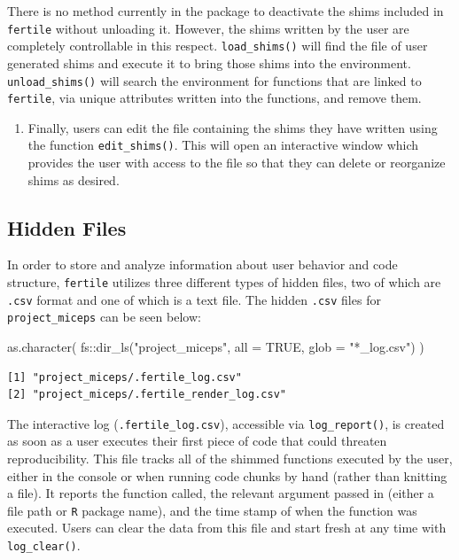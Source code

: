 \documentclass[12pt,twoside]{reedthesis}
\newenvironment{Shaded}{\begin{snugshade}}{\end{snugshade}}
\newcommand{\AttributeTok}[1]{\textcolor[rgb]{0.77,0.63,0.00}{#1}}
\newcommand{\ConstantTok}[1]{\textcolor[rgb]{0.00,0.00,0.00}{#1}}
\newcommand{\FunctionTok}[1]{\textcolor[rgb]{0.00,0.00,0.00}{#1}}
\newcommand{\NormalTok}[1]{#1}
\newcommand{\SpecialCharTok}[1]{\textcolor[rgb]{0.00,0.00,0.00}{#1}}
\newcommand{\StringTok}[1]{\textcolor[rgb]{0.31,0.60,0.02}{#1}}
\providecommand{\tightlist}{%
  \setlength{\itemsep}{0pt}\setlength{\parskip}{0pt}}
\begin{document}
There is no method currently in the package to deactivate the shims included in \texttt{fertile} without unloading it. However, the shims written by the user are completely controllable in this respect. \texttt{load\_shims()} will find the file of user generated shims and execute it to bring those shims into the environment. \texttt{unload\_shims()} will search the environment for functions that are linked to \texttt{fertile}, via unique attributes written into the functions, and remove them.
\begin{enumerate}
\def\labelenumi{\arabic{enumi}.}
\setcounter{enumi}{3}
\tightlist
\item
  Finally, users can edit the file containing the shims they have written using the function \texttt{edit\_shims()}. This will open an interactive window which provides the user with access to the file so that they can delete or reorganize shims as desired.
\end{enumerate}
\hypertarget{hidden-files}{%
\subsection{Hidden Files}\label{hidden-files}}

In order to store and analyze information about user behavior and code structure, \texttt{fertile} utilizes three different types of hidden files, two of which are \texttt{.csv} format and one of which is a text file. The hidden \texttt{.csv} files for \texttt{project\_miceps} can be seen below:
\begin{Shaded}
\begin{Highlighting}[]
\FunctionTok{as.character}\NormalTok{(}
\NormalTok{  fs}\SpecialCharTok{::}\FunctionTok{dir\_ls}\NormalTok{(}\StringTok{"project\_miceps"}\NormalTok{, }\AttributeTok{all =} \ConstantTok{TRUE}\NormalTok{, }\AttributeTok{glob =} \StringTok{"*\_log.csv"}\NormalTok{)}
\NormalTok{)}
\end{Highlighting}
\end{Shaded}
\begin{verbatim}
[1] "project_miceps/.fertile_log.csv"       
[2] "project_miceps/.fertile_render_log.csv"
\end{verbatim}
The interactive log (\texttt{.fertile\_log.csv}), accessible via \texttt{log\_report()}, is created as soon as a user executes their first piece of code that could threaten reproducibility. This file tracks all of the shimmed functions executed by the user, either in the console or when running code chunks by hand (rather than knitting a file). It reports the function called, the relevant argument passed in (either a file path or \texttt{R} package name), and the time stamp of when the function was executed. Users can clear the data from this file and start fresh at any time with \texttt{log\_clear()}.
\end{document}
